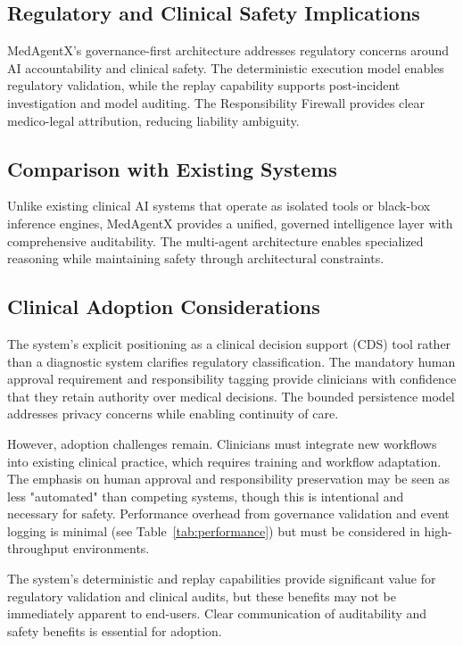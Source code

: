 \documentclass[journal]{IEEEtran}
\begin{document}
\subsection{Regulatory and Clinical Safety Implications}
MedAgentX's governance-first architecture addresses regulatory concerns around AI accountability and clinical safety. The deterministic execution model enables regulatory validation, while the replay capability supports post-incident investigation and model auditing. The Responsibility Firewall provides clear medico-legal attribution, reducing liability ambiguity.

\subsection{Comparison with Existing Systems}
Unlike existing clinical AI systems that operate as isolated tools or black-box inference engines, MedAgentX provides a unified, governed intelligence layer with comprehensive auditability. The multi-agent architecture enables specialized reasoning while maintaining safety through architectural constraints.

\subsection{Clinical Adoption Considerations}
The system's explicit positioning as a clinical decision support (CDS) tool rather than a diagnostic system clarifies regulatory classification. The mandatory human approval requirement and responsibility tagging provide clinicians with confidence that they retain authority over medical decisions. The bounded persistence model addresses privacy concerns while enabling continuity of care.

However, adoption challenges remain. Clinicians must integrate new workflows into existing clinical practice, which requires training and workflow adaptation. The emphasis on human approval and responsibility preservation may be seen as less "automated" than competing systems, though this is intentional and necessary for safety. Performance overhead from governance validation and event logging is minimal (see Table~\ref{tab:performance}) but must be considered in high-throughput environments.

The system's deterministic and replay capabilities provide significant value for regulatory validation and clinical audits, but these benefits may not be immediately apparent to end-users. Clear communication of auditability and safety benefits is essential for adoption.
\end{document}
